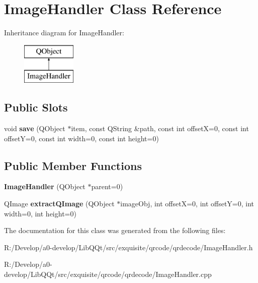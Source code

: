 \hypertarget{class_image_handler}{}\section{Image\+Handler Class Reference}
\label{class_image_handler}
Inheritance diagram for Image\+Handler\+:\begin{figure}[H]
\begin{center}
\leavevmode
\includegraphics[height=2.000000cm]{class_image_handler}
\end{center}
\end{figure}
\subsection*{Public Slots}
\begin{DoxyCompactItemize}
\item 
\mbox{\label{class_image_handler_adfd02dcfec60a77f734428afc7f64c21}} 
void {\bfseries save} (Q\+Object $\ast$item, const Q\+String \&path, const int offsetX=0, const int offsetY=0, const int width=0, const int height=0)
\end{DoxyCompactItemize}
\subsection*{Public Member Functions}
\begin{DoxyCompactItemize}
\item 
\mbox{\label{class_image_handler_a04df317054330446c1b4f95b01d4fdc4}} 
{\bfseries Image\+Handler} (Q\+Object $\ast$parent=0)
\item 
\mbox{\label{class_image_handler_a7269f1f41e02d47eab3023bff2f90fcb}} 
Q\+Image {\bfseries extract\+Q\+Image} (Q\+Object $\ast$image\+Obj, int offsetX=0, int offsetY=0, int width=0, int height=0)
\end{DoxyCompactItemize}


The documentation for this class was generated from the following files\+:\begin{DoxyCompactItemize}
\item 
R\+:/\+Develop/a0-\/develop/\+Lib\+Q\+Qt/src/exquisite/qrcode/qrdecode/Image\+Handler.\+h\item 
R\+:/\+Develop/a0-\/develop/\+Lib\+Q\+Qt/src/exquisite/qrcode/qrdecode/Image\+Handler.\+cpp\end{DoxyCompactItemize}
